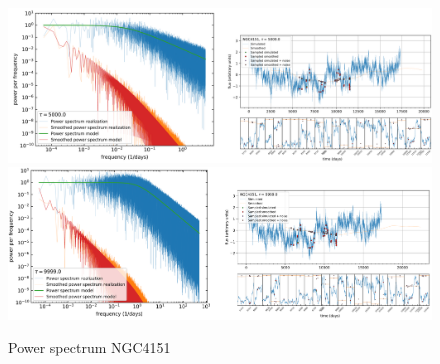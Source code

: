 \begin{figure}
\begin{center}
    {
  \includegraphics[width=\textwidth]{Figs/Chapter5/NGC4151/Screenshots/NGC4151_tau5000_LC_spectrum.pdf} \\
  \includegraphics[width=\textwidth]{Figs/Chapter5/NGC4151/Screenshots/NGC4151_tau9999_LC_spectrum.pdf} \\
  \caption{Power spectrum NGC4151}
    \label{fig:power_spectra_2_NGC4151}
  }
\end{center}
\end{figure}

